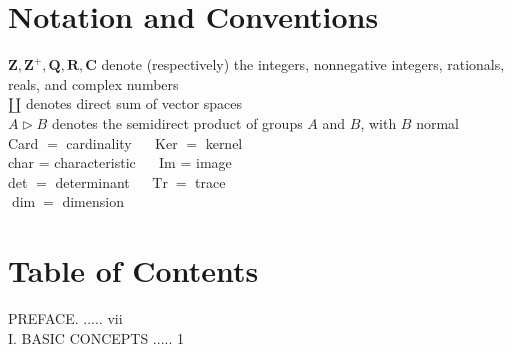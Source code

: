 \documentclass[10pt]{article}
\begin{document}
\section*{Notation and Conventions}
$\mathbf{Z}, \mathbf{Z}^{+}, \mathbf{Q}, \mathbf{R}, \mathbf{C}$ denote (respectively) the integers, nonnegative integers, rationals, reals, and complex numbers\\
$\amalg$ denotes direct sum of vector spaces\\
$A \triangleright B$ denotes the semidirect product of groups $A$ and $B$, with $B$ normal\\
Card $=$ cardinality $\quad$ Ker $=$ kernel\\
char = characteristic $\quad$ Im = image\\
det $=$ determinant $\quad \operatorname{Tr}=$ trace\\
$\operatorname{dim}=$ dimension

\section*{Table of Contents}
PREFACE. ..... vii\\
I. BASIC CONCEPTS ..... 1
\end{document}
